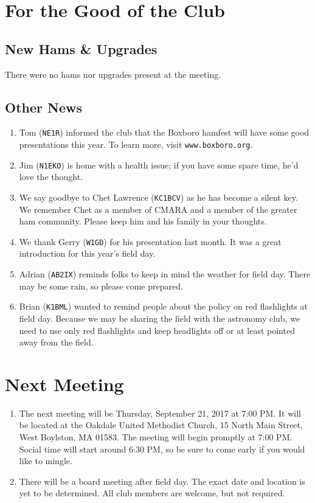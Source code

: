 \documentclass[10pt,letterpaper]{article}
\begin{document}
\section{For the Good of the Club}

\subsection{New Hams \& Upgrades}
There were no hams nor upgrades present at the meeting.

\subsection{Other News}
\begin{enumerate}
  \item Tom (\texttt{NE1R}) informed the club that the Boxboro hamfest will have some good presentations this year. To learn more, visit \texttt{www.boxboro.org}.
  \item Jim (\texttt{N1EKO}) is home with a health issue; if you have some spare time, he'd love the thought.
  \item We say goodbye to Chet Lawrence (\texttt{KC1BCV}) as he has become a silent key. We remember Chet as a member of CMARA and a member of the greater ham community. Please keep him and his family in your thoughts.
  \item We thank Gerry (\texttt{W1GD}) for his presentation last month. It was a great introduction for this year's field day.
  \item Adrian (\texttt{AB2IX}) reminds folks to keep in mind the weather for field day. There may be some rain, so please come prepared.
  \item Brian (\texttt{K1BML}) wanted to remind people about the policy on red flashlights at field day. Because we may be sharing the field with the astronomy club, we need to use only red flashlights and keep headlights off or at least pointed away from the field.
\end{enumerate}

\section{Next Meeting}
\begin{enumerate}
  \item The next meeting will be Thursday, September 21, 2017 at 7:00 PM. It will be located at the Oakdale United Methodist Church, 15 North Main Street, West Boylston, MA 01583. The meeting will begin promptly at 7:00 PM. Social time will start around 6:30 PM, so be sure to come early if you would like to mingle.
  \item There will be a board meeting after field day. The exact date and location is yet to be determined. All club members are welcome, but not required.
\end{enumerate}
\end{document}

